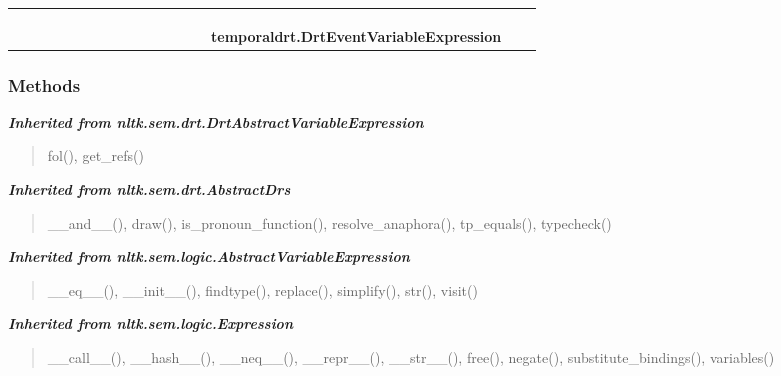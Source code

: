 \begin{tabular}{cccccccccccccccccc}
  \\\cline{13-13}
  &&&&&&&&&&&&\multicolumn{1}{c|}{}
&\multicolumn{1}{|c}{}&
&\multicolumn{1}{|c}{}&
  \\
\multicolumn{14}{r}{\settowidth{\BCL}{nltk.sem.drt.DrtEventVariableExpression}\multirow{2}{\BCL}{nltk.sem.drt.DrtEventVariableExpression}}
&&\multicolumn{1}{|c}{}
  \\\cline{15-15}
  &&&&&&&&&&&&&&\multicolumn{1}{c|}{}
&\multicolumn{1}{|c}{}&
  \\
&&&&&&&&&&&&&&\multicolumn{2}{l}{\textbf{temporaldrt.DrtEventVariableExpression}}
\end{tabular}



  \subsubsection{Methods}


\large{\textbf{\textit{Inherited from nltk.sem.drt.DrtAbstractVariableExpression}}}

\begin{quote}
fol(), get\_refs()
\end{quote}

\large{\textbf{\textit{Inherited from nltk.sem.drt.AbstractDrs}}}

\begin{quote}
\_\_and\_\_(), draw(), is\_pronoun\_function(), resolve\_anaphora(), tp\_equals(), typecheck()
\end{quote}

\large{\textbf{\textit{Inherited from nltk.sem.logic.AbstractVariableExpression}}}

\begin{quote}
\_\_eq\_\_(), \_\_init\_\_(), findtype(), replace(), simplify(), str(), visit()
\end{quote}

\large{\textbf{\textit{Inherited from nltk.sem.logic.Expression}}}

\begin{quote}
\_\_call\_\_(), \_\_hash\_\_(), \_\_neq\_\_(), \_\_repr\_\_(), \_\_str\_\_(), free(), negate(), substitute\_bindings(), variables()
\end{quote}

